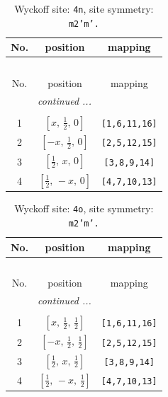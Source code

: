 \documentclass[fleqn,8pt]{jsarticle}
\begin{document}
\renewcommand{\arraystretch}{1.2}
\begin{longtable}{ccc}
\caption{Wyckoff site: {\tt 4n}, site symmetry: {\tt m2'm'.}}
 \\
 \hline \hline
No. & position & mapping \\ \hline \endfirsthead

\multicolumn{2}{l}{\tablename\ \thetable{}} \\
 \hline \hline
No. & position & mapping \\ \hline \endhead

 \hline \hline
\multicolumn{2}{r}{\footnotesize\it continued ...} \\ \endfoot

 \hline \hline
\multicolumn{2}{r}{} \\ \endlastfoot

1 & $\left[ x,\, \frac{1}{2},\, 0 \right]$ & {\tt [1,6,11,16]} \\ \hline
2 & $\left[ - x,\, \frac{1}{2},\, 0 \right]$ & {\tt [2,5,12,15]} \\ \hline
3 & $\left[ \frac{1}{2},\, x,\, 0 \right]$ & {\tt [3,8,9,14]} \\ \hline
4 & $\left[ \frac{1}{2},\, - x,\, 0 \right]$ & {\tt [4,7,10,13]} \\
\end{longtable}
\renewcommand{\arraystretch}{1.2}
\begin{longtable}{ccc}
\caption{Wyckoff site: {\tt 4o}, site symmetry: {\tt m2'm'.}}
 \\
 \hline \hline
No. & position & mapping \\ \hline \endfirsthead

\multicolumn{2}{l}{\tablename\ \thetable{}} \\
 \hline \hline
No. & position & mapping \\ \hline \endhead

 \hline \hline
\multicolumn{2}{r}{\footnotesize\it continued ...} \\ \endfoot

 \hline \hline
\multicolumn{2}{r}{} \\ \endlastfoot

1 & $\left[ x,\, \frac{1}{2},\, \frac{1}{2} \right]$ & {\tt [1,6,11,16]} \\ \hline
2 & $\left[ - x,\, \frac{1}{2},\, \frac{1}{2} \right]$ & {\tt [2,5,12,15]} \\ \hline
3 & $\left[ \frac{1}{2},\, x,\, \frac{1}{2} \right]$ & {\tt [3,8,9,14]} \\ \hline
4 & $\left[ \frac{1}{2},\, - x,\, \frac{1}{2} \right]$ & {\tt [4,7,10,13]} \\
\end{longtable}
\end{document}
